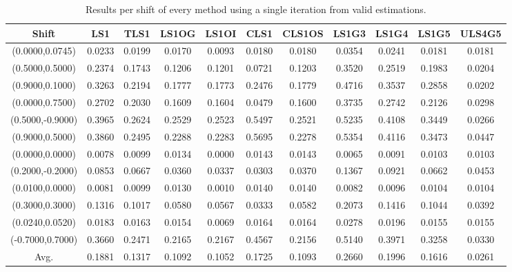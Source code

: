 \begin{table}[ht!]
\centering
\begin{tabular}{c|c|c|c|c|c|c|c|c|c|c}
Shift & \scriptsize{LS1} & \scriptsize{TLS1} & \scriptsize{LS1OG} & \scriptsize{LS1OI} & \scriptsize{CLS1} & \scriptsize{CLS1OS} & \scriptsize{LS1G3} & \scriptsize{LS1G4} & \scriptsize{LS1G5} & \scriptsize{ULS4G5}\\ \hline 
(0.0000,0.0745) & 0.0233 & 0.0199 & 0.0170 & 0.0093 & 0.0180 & 0.0180 & 0.0354 & 0.0241 & 0.0181 & 0.0181 \\ \hline
(0.5000,0.5000) & 0.2374 & 0.1743 & 0.1206 & 0.1201 & 0.0721 & 0.1203 & 0.3520 & 0.2519 & 0.1983 & 0.0204 \\ \hline
(0.9000,0.1000) & 0.3263 & 0.2194 & 0.1777 & 0.1773 & 0.2476 & 0.1779 & 0.4716 & 0.3537 & 0.2858 & 0.0202 \\ \hline
(0.0000,0.7500) & 0.2702 & 0.2030 & 0.1609 & 0.1604 & 0.0479 & 0.1600 & 0.3735 & 0.2742 & 0.2126 & 0.0298 \\ \hline
(0.5000,-0.9000) & 0.3965 & 0.2624 & 0.2529 & 0.2523 & 0.5497 & 0.2521 & 0.5235 & 0.4108 & 0.3449 & 0.0266 \\ \hline
(0.9000,0.5000) & 0.3860 & 0.2495 & 0.2288 & 0.2283 & 0.5695 & 0.2278 & 0.5354 & 0.4116 & 0.3473 & 0.0447 \\ \hline
(0.0000,0.0000) & 0.0078 & 0.0099 & 0.0134 & 0.0000 & 0.0143 & 0.0143 & 0.0065 & 0.0091 & 0.0103 & 0.0103 \\ \hline
(0.2000,-0.2000) & 0.0853 & 0.0667 & 0.0360 & 0.0337 & 0.0303 & 0.0370 & 0.1367 & 0.0921 & 0.0662 & 0.0453 \\ \hline
(0.0100,0.0000) & 0.0081 & 0.0099 & 0.0130 & 0.0010 & 0.0140 & 0.0140 & 0.0082 & 0.0096 & 0.0104 & 0.0104 \\ \hline
(0.3000,0.3000) & 0.1316 & 0.1017 & 0.0580 & 0.0567 & 0.0333 & 0.0582 & 0.2073 & 0.1416 & 0.1044 & 0.0392 \\ \hline
(0.0240,0.0520) & 0.0183 & 0.0163 & 0.0154 & 0.0069 & 0.0164 & 0.0164 & 0.0278 & 0.0196 & 0.0155 & 0.0155 \\ \hline
(-0.7000,0.7000) & 0.3660 & 0.2471 & 0.2165 & 0.2167 & 0.4567 & 0.2156 & 0.5140 & 0.3971 & 0.3258 & 0.0330 \\ \hline
Avg.  & 0.1881 & 0.1317 & 0.1092 & 0.1052 & 0.1725 & 0.1093 & 0.2660 & 0.1996 & 0.1616 & 0.0261 \\ \hline
\end{tabular}
\caption{Results per shift of every method using a single iteration from valid estimations.}
\label{tab:1itperShiftValid}
\end{table}


